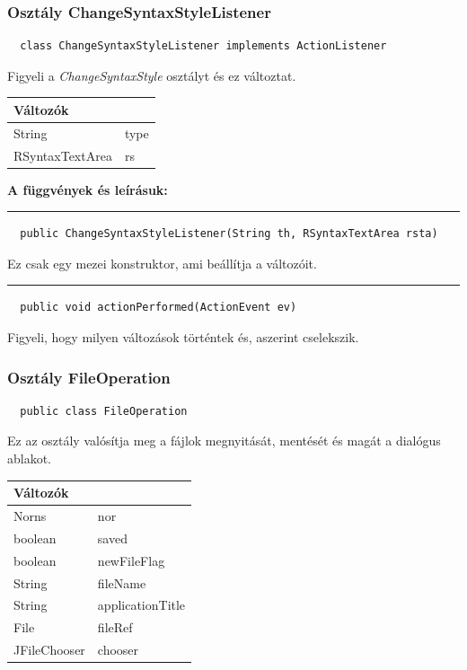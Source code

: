 \documentclass[12pt]{article}
\newcommand{\fuggveny}{\textbf{A függvények és leírásuk: \\}}
\newcommand{\vonal}{\noindent\rule{\textwidth}{1pt}}
\begin{document}
\subsubsection*{Osztály ChangeSyntaxStyleListener}
\begin{lstlisting}
  class ChangeSyntaxStyleListener implements ActionListener
\end{lstlisting}
Figyeli a \textit{ChangeSyntaxStyle} osztályt és ez változtat.

\begin{longtable}{|p{5cm}|p{10cm}|} \hline
    \multicolumn{2}{|p{15cm}|}{\textbf{Változók}}  \\ \hline
    String & type \\ \hline
    RSyntaxTextArea & rs \\ \hline
\end{longtable}

\fuggveny
\vonal
\begin{lstlisting}
  public ChangeSyntaxStyleListener(String th, RSyntaxTextArea rsta)
\end{lstlisting}
Ez csak egy mezei konstruktor, ami beállítja a változóit.

\vonal
\begin{lstlisting}
  public void actionPerformed(ActionEvent ev)
\end{lstlisting}
Figyeli, hogy milyen változások történtek és, aszerint cselekszik.

\subsubsection*{Osztály FileOperation}
\begin{lstlisting}
  public class FileOperation
\end{lstlisting}
Ez az osztály valósítja meg a fájlok megnyitását, mentését és magát a dialógus
ablakot.

\begin{longtable}{|p{5cm}|p{10cm}|} \hline
    \multicolumn{2}{|p{15cm}|}{\textbf{Változók}}  \\ \hline
    Norns & nor \\ \hline
  	boolean & saved \\ \hline
  	boolean & newFileFlag \\ \hline
  	String & fileName \\ \hline
  	String & applicationTitle \\ \hline
  	File & fileRef \\ \hline
  	JFileChooser & chooser \\ \hline
\end{longtable}
\end{document}
